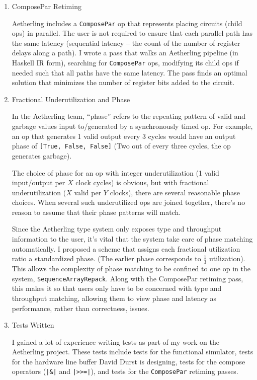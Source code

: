 \documentclass[12pt]{article}
\begin{document}
\begin{enumerate}
\item ComposePar Retiming

Aetherling includes a \texttt{ComposePar} op that represents placing
circuits (child ops) in parallel. The user is not required to ensure
that each parallel path has the same latency (sequential latency --
the count of the number of register delays along a path). I wrote a
pass that walks an Aetherling pipeline (in Haskell IR form), searching
for \texttt{ComposePar} ops, modifying its child ops if needed such
that all paths have the same latency. The pass finds an optimal
solution that minimizes the number of register bits added to the
circuit.

\item Fractional Underutilization and Phase

In the Aetherling team, ``phase'' refers to the repeating pattern of
valid and garbage values input to/generated by a synchronously timed
op. For example, an op that generates 1 valid output every 3 cycles
would have an output phase of \texttt{[True, False, False]} (Two out
of every three cycles, the op generates garbage).

The choice of phase for an op with integer underutilization (1 valid
input/output per $X$ clock cycles) is obvious, but with fractional
underutilization ($X$ valid per $Y$ clocks), there are several
reasonable phase choices. When several such underutilized ops are
joined together, there's no reason to assume that their phase patterns
will match.

Since the Aetherling type system only exposes type and throughput
information to the user, it's vital that the system take care of phase
matching automatically. I proposed a scheme that assigns each
fractional utilization ratio a standardized phase. (The earlier phase
corresponds to $\frac{1}{3}$ utilization). This allows the complexity
of phase matching to be confined to one op in the system,
\texttt{SequenceArrayRepack}. Along with the ComposePar retiming pass,
this makes it so that users only have to be concerned with type and
throughput matching, allowing them to view phase and latency as
performance, rather than correctness, issues.

\item Tests Written

I gained a lot of experience writing tests as part of my work on the
Aetherling project. These tests include tests for the functional
simulator, tests for the hardware line buffer David Durst is
designing, tests for the compose operators (\texttt{|\&|} and
\texttt{|>>=|}), and tests for the \texttt{ComposePar} retiming passes.

\end{enumerate}
\end{document}
